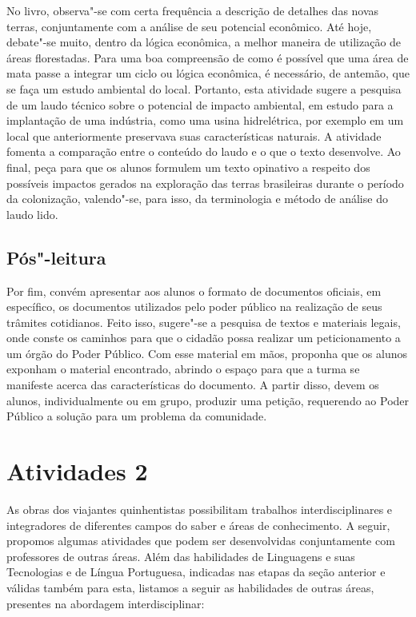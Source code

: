 \documentclass[12pt]{extarticle}
\begin{document}
No livro, observa"-se com certa frequência a descrição de detalhes das
novas terras, conjuntamente com a análise de seu potencial econômico.
Até hoje, debate"-se muito, dentro da lógica econômica, a melhor maneira
de utilização de áreas florestadas. Para uma boa compreensão de como é
possível que uma área de mata passe a integrar um ciclo ou lógica
econômica, é necessário, de antemão, que se faça um estudo ambiental do
local. Portanto, esta atividade sugere a pesquisa de um laudo técnico
sobre o potencial de impacto ambiental, em estudo para a implantação de
uma indústria, como uma usina hidrelétrica, por exemplo em um local que
anteriormente preservava suas características naturais. A atividade
fomenta a comparação entre o conteúdo do laudo e o que o texto
desenvolve. Ao final, peça para que os alunos formulem um texto
opinativo a respeito dos possíveis impactos gerados na exploração das
terras brasileiras durante o período da colonização, valendo"-se, para
isso, da terminologia e método de análise do laudo lido.

\subsection{Pós"-leitura}


Por fim, convém apresentar aos alunos o formato de
documentos oficiais, em específico, os documentos utilizados pelo poder
público na realização de seus trâmites cotidianos. Feito isso, sugere"-se
a pesquisa de textos e materiais legais, onde conste os caminhos para
que o cidadão possa realizar um peticionamento a um órgão do Poder
Público. Com esse material em mãos, proponha que os alunos exponham o
material encontrado, abrindo o espaço para que a turma se manifeste
acerca das características do documento. A partir disso, devem os
alunos, individualmente ou em grupo, produzir uma petição, requerendo ao
Poder Público a solução para um problema da comunidade.

\section{Atividades 2}

As obras dos viajantes quinhentistas possibilitam trabalhos
interdisciplinares e integradores de diferentes campos do saber e áreas
de conhecimento. A seguir, propomos algumas atividades que podem ser
desenvolvidas conjuntamente com professores de outras áreas. Além das
habilidades de Linguagens e suas Tecnologias e de Língua Portuguesa,
indicadas nas etapas da seção anterior e válidas também para esta,
listamos a seguir as habilidades de outras áreas, presentes na abordagem
interdisciplinar:
\end{document}

